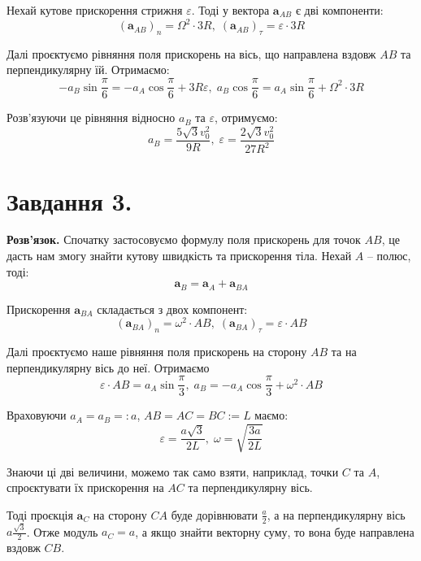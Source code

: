\documentclass[12pt]{extarticle}
\begin{document}
Нехай кутове прискорення стрижня $\varepsilon$. Тоді у вектора $\boldsymbol{a}_{AB}$ є дві компоненти:
\[
(\boldsymbol{a}_{AB})_n = \Omega^2 \cdot 3R, \; (\boldsymbol{a}_{AB})_{\tau} = \varepsilon \cdot 3R
\]

Далі проєктуємо рівняння поля прискорень на вісь, що направлена вздовж $AB$ та перпендикулярну їй. Отримаємо:
\[
-a_B \sin \frac{\pi}{6} = -a_A \cos \frac{\pi}{6} + 3R\varepsilon, \; a_B \cos \frac{\pi}{6} = a_A \sin \frac{\pi}{6} + \Omega^2 \cdot 3R
\]

Розв'язуючи це рівняння відносно $a_B$ та $\varepsilon$, отримуємо:
\[
a_B = \frac{5\sqrt{3}v_0^2}{9R}, \; \varepsilon = \frac{2\sqrt{3}v_0^2}{27R^2}
\]

\section*{Завдання 3.}

\textbf{Розв'язок.} Спочатку застосовуємо формулу поля прискорень для точок $AB$, це дасть нам змогу знайти кутову швидкість та прискорення тіла. Нехай $A$ -- полюс, тоді:
\[
\boldsymbol{a}_B = \boldsymbol{a}_A + \boldsymbol{a}_{BA}
\]

Прискорення $\boldsymbol{a}_{BA}$ складається з двох компонент:
\[
(\boldsymbol{a}_{BA})_{n} = \omega^2 \cdot AB, \; (\boldsymbol{a}_{BA})_{\tau} = \varepsilon \cdot AB
\]

Далі проєктуємо наше рівняння поля прискорень на сторону $AB$ та на перпендикулярну вісь до неї. Отримаємо
\[
\varepsilon \cdot AB = a_A \sin \frac{\pi}{3}, \; a_B = -a_A \cos \frac{\pi}{3} + \omega^2 \cdot AB 
\]

Враховуючи $a_A=a_B=:a$, $AB = AC = BC := L$ маємо:
\[
\varepsilon = \frac{a \sqrt{3}}{2L}, \; \omega = \sqrt{\frac{3a}{2L}}
\]

Знаючи ці дві величини, можемо так само взяти, наприклад, точки $C$ та $A$, спроєктувати їх прискорення на $AC$ та перпендикулярну вісь.

Тоді проєкція $\boldsymbol{a}_C$ на сторону $CA$ буде дорівнювати $\frac{a}{2}$, а на перпендикулярну вісь $a \frac{\sqrt{3}}{2}$. Отже модуль $a_C=a$, а якщо знайти векторну суму, то вона буде направлена вздовж $CB$.
\end{document}
